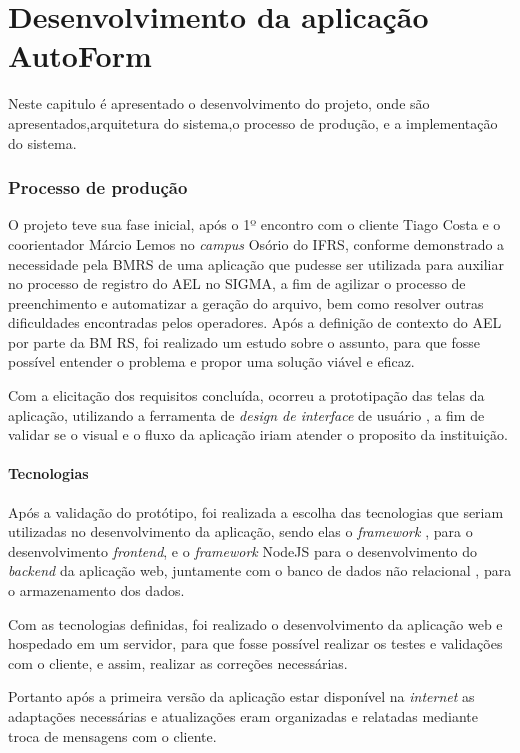 \chapter{Desenvolvimento da aplicação AutoForm}
Neste capitulo é apresentado o desenvolvimento do projeto, onde são apresentados,arquitetura do sistema,o processo de produção, e a implementação do sistema.

\subsection{Processo de produção}
O projeto teve sua fase inicial, após o 1º encontro com o cliente Tiago Costa e o coorientador Márcio Lemos no \textit{campus} Osório do IFRS, conforme demonstrado a necessidade pela BMRS de uma aplicação que pudesse ser utilizada para auxiliar no processo de registro do AEL no SIGMA, a fim de agilizar o processo de preenchimento e automatizar a geração do arquivo, bem como resolver outras dificuldades encontradas pelos operadores.
Após a definição de contexto do AEL por parte da BM RS, foi realizado um estudo sobre o assunto, para que fosse possível entender o problema e propor uma solução viável e eficaz. 

Com a elicitação dos requisitos concluída, ocorreu a prototipação das telas da aplicação, utilizando a ferramenta de \textit{design de interface } de usuário \cite{figma}, a fim de validar se o visual e o fluxo da aplicação iriam atender o proposito da instituição.

\subsubsection{Tecnologias}\label{sec:tecnologias}
Após a validação do protótipo, foi realizada a escolha das tecnologias que seriam utilizadas no desenvolvimento da aplicação, sendo elas o \textit{framework} \cite{React22:online}, para o desenvolvimento \textit{frontend}, e o \textit{framework} NodeJS \cite{Nodejs} para o desenvolvimento do \textit{backend} da aplicação web, juntamente com o banco de dados não relacional \cite{MongoDBA45:online}, para o armazenamento dos dados.

Com as tecnologias definidas, foi realizado o desenvolvimento da aplicação web e hospedado em um servidor, para que fosse possível realizar os testes e validações com o cliente, e assim, realizar as correções necessárias. 

Portanto após a primeira versão da aplicação estar disponível na \textit{internet} as adaptações necessárias e atualizações eram organizadas e relatadas mediante troca de mensagens com o cliente.

